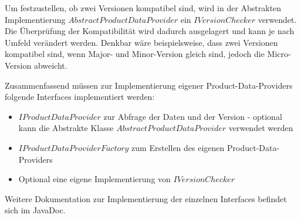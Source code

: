 \documentclass[headsepline=true, footsepline=true]{scrartcl}
\begin{document}
Um festzustellen, ob zwei Versionen kompatibel sind, wird in der Abstrakten
Implementierung $AbstractProductDataProvider$ ein $IVersionChecker$ verwendet.
Die Überprüfung der Kompatibilität wird dadurch ausgelagert und kann je nach
Umfeld verändert werden. Denkbar wäre beispielsweise, dass zwei Versionen
kompatibel sind, wenn Major- und Minor-Version gleich sind, jedoch die
Micro-Version abweicht.

Zusammenfassend müssen zur Implementierung eigener Product-Data-Providers
folgende Interfaces implementiert werden:

\begin{itemize}
	\item $IProductDataProvider$ zur Abfrage der Daten und der Version - optional
	kann die Abstrakte Klasse $AbstractProductDataProvider$ verwendet werden
	\item $IProductDataProviderFactory$ zum Erstellen des eigenen
	Product-Data-Providers
	\item Optional eine eigene Implementierung von $IVersionChecker$
\end{itemize}

Weitere Dokumentation zur Implementierung der einzelnen Interfaces befindet sich
im JavaDoc.


\end{document}
